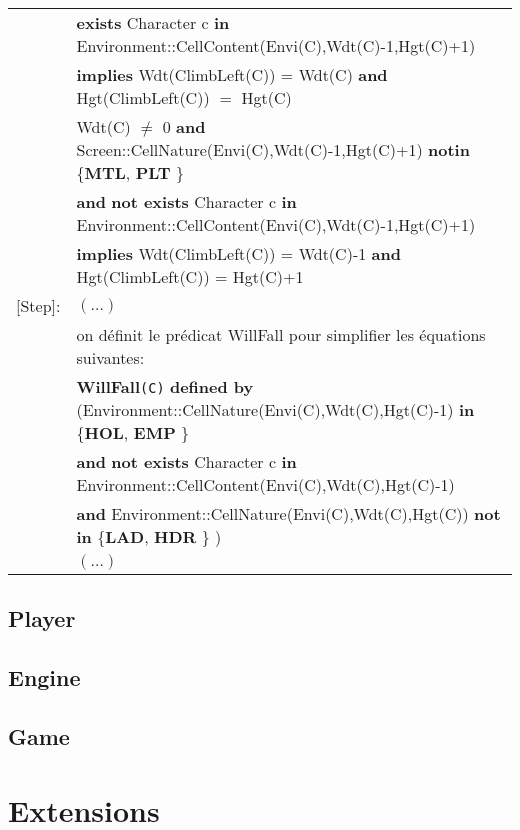 \documentclass[8pt]{article}
\begin{document}
{\begin{tabular}{rl}
  & \textbf{exists} \textrm{Character} c \textbf{in} \textrm{Environment::CellContent(Envi(C),Wdt(C)-1,Hgt(C)+1)} \\
  & \quad\quad \textbf{implies} \textrm{Wdt(ClimbLeft(C))} = \textrm{Wdt(C)} \textbf{and} \textrm{Hgt(ClimbLeft(C))} $=$ \textrm{Hgt(C)} \\
  & \textrm{Wdt(C)} $\neq$ 0 \textbf{and} \textrm{Screen::CellNature(Envi(C),Wdt(C)-1,Hgt(C)+1)} \textbf{notin} \{\textbf{MTL}, \textbf{PLT} \} \\
  & \quad\quad \textbf{and} \textbf{not exists} \textrm{Character} c \textbf{in} \textrm{Environment::CellContent(Envi(C),Wdt(C)-1,Hgt(C)+1)} \\
  & \quad\quad \textbf{implies} \textrm{Wdt(ClimbLeft(C))} = \textrm{Wdt(C)}-1 \textbf{and} \textrm{Hgt(ClimbLeft(C))} = \textrm{Hgt(C)}+1 \\
  \textrm{[Step]}: & $(\dots)$ \\
  & on définit le prédicat WillFall pour simplifier les équations suivantes: \\
  & \textbf{WillFall}\texttt{(C)} \textbf{defined by} (\textrm{Environment::CellNature(Envi(C),Wdt(C),Hgt(C)-1)} \textbf{in} \{\textbf{HOL}, \textbf{EMP} \}  \\
  & \quad\quad\quad\quad\quad\quad\quad\quad\quad\quad \textbf{and} \textbf{not exists} \textrm{Character} c \textbf{in} \textrm{Environment::CellContent(Envi(C),Wdt(C),Hgt(C)-1)} \\
  & \quad\quad\quad\quad\quad\quad\quad\quad\quad\quad \textbf{and} \textrm{Environment::CellNature(Envi(C),Wdt(C),Hgt(C))} \textbf{not in} \{\textbf{LAD}, \textbf{HDR} \} ) \\
  & $(\dots)$
\end{tabular}}

\subsection{Player}

\subsection{Engine}

\subsection{Game}

\section{Extensions}
\end{document}
